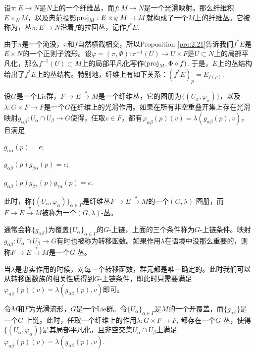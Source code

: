 \begin{para}[拉回丛]
设$\pi:E\to N$是$N$上的一个纤维丛，而$f:M\to N$是一个光滑映射。那么纤维积$E\times_N M$，以及典范投影$\operatorname{proj}_M:E\times_N M\to M$就构成了一个$M$上的纤维丛。它被称为，丛$\pi:E\to N$沿着$f$的拉回丛，记作$f^*E$.
\end{para}

由于$\pi$是一个淹没，$\pi$和$f$自然横截相交，所以Proposition \ref{pro:2.21}告诉我们$f^*E$是$E\times N$的一个正则子流形。设$\varphi=(\pi,\Phi):\pi^{-1}(U)\to U\times F$是$U\subset N$上的局部平凡化，那么$f^{-1}(U)\subset M$上的局部平凡化写作$(\operatorname{proj}_M,\Phi\circ f)$. 于是，$E$上的丛结构给出了$f^*E$上的丛结构。特别地，纤维上有如下关系：$(f^*E)_{p}=E_{f(p)}$.

\begin{para}[$G$-丛]
设$G$是一个Lie群，$F\to E\xrightarrow{\pi} M$是一个纤维丛，它的图册为$\{(U_\alpha,\varphi_\alpha)\}$，以及$\lambda:G\times F\to F$是一个$G$在纤维上的光滑作用。如果在所有非空重叠开集上存在光滑映射$g_{\alpha\beta}:U_\alpha\cap U_\beta\to G$使得，任取$v\in F$，都有$\varphi_{\alpha\beta}(p)(v)=\lambda(g_{\alpha\beta}(p),v)$，且满足
\begin{compactenum}[~~~(1)]
	\item $g_{\alpha\alpha}(p)=e$;
	\item $g_{\alpha\beta}(p) g_{\beta\alpha}(p)=e$;
	\item $g_{\alpha\beta}(p) g_{\beta\gamma}(p) g_{\gamma\alpha}(p)=e$.
\end{compactenum}
此时，称$\{(U_\alpha,\varphi_\alpha)\}_{\alpha\in \Gamma}$是纤维丛$F\to E\xrightarrow{\pi} M$的一个$(G,\lambda)$-图册，而$F\to E\xrightarrow{\pi} M$被称为一个$(G,\lambda)$-丛。

通常会称$\{g_{\alpha\beta}\}$为覆盖$\{U_\alpha\}_{\alpha\in \Gamma}$的$G$-上链，上面的三个条件称为$G$-上链条件。映射$g_{\alpha\beta}:U_\alpha\cap U_\beta\to G$有时也被称为转移函数。如果作用$\lambda$在语境中没那么重要的，则称$F\to E\xrightarrow{\pi} M$是一个$G$-丛。
\end{para}

当$\lambda$是忠实作用的时候，对每一个转移函数，群元都是唯一确定的。此时我们可以从转移函数族的相关性质得到$G$-上链条件，即此时只需要满足$\varphi_{\alpha\beta}(p)(v)=\lambda(g_{\alpha\beta}(p),v)$即可。

\begin{thm}[$G$-丛构造定理]
	令$M$和$F$为光滑流形，$G$是一个Lie群。令$\{U_\alpha\}_{\alpha\in \Gamma}$是$M$的一个开覆盖，而$\{g_{\alpha\beta}\}$是一个$G$-上链。此时，任取一个纤维上的作用$\lambda:G\times F\to F$, 都存在一个$G$-丛，使得$\{(U_\alpha,\varphi_\alpha)\}$是其局部平凡化，且非空交集$U_\alpha\cap U_\beta$上满足$\varphi_{\alpha\beta}(p)(v)=\lambda(g_{\alpha\beta}(p),v)$. 
\end{thm}

